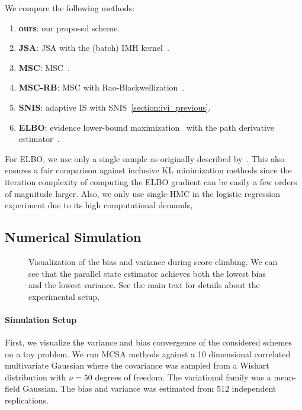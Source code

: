 We compare the following methods:
\begin{enumerate}[noitemsep]
\item[\ding{182}] \textbf{ours}: our proposed scheme.
\item[\ding{183}] \textbf{JSA}: JSA with the (batch) IMH kernel~\citep{pmlr-v124-ou20a}.
\item[\ding{184}] \textbf{MSC}: MSC~\citep{NEURIPS2020_b2070693}.
\item[\ding{185}] \textbf{MSC-RB}: MSC with Rao-Blackwellization~\citep{NEURIPS2020_b2070693}.
\item[\ding{186}] \textbf{SNIS}: adaptive IS with SNIS~\cref{section:ivi_previous}.
\item[\ding{187}] \textbf{ELBO}: evidence lower-bound maximization~\citep{pmlr-v33-ranganath14, JMLR:v18:16-107} with the path derivative estimator~\citep{NIPS2017_e91068ff}.
\end{enumerate}
For ELBO, we use only a single sample as originally described by~\citet{NIPS2017_e91068ff}.
This also ensures a fair comparison against inclusive KL minimization methods since the iteration complexity of computing the ELBO gradient can be easily a few orders of magnitude larger.
Also, we only use single-HMC in the logistic regression experiment due to its high computational demands, 

\subsection{Numerical Simulation}\label{section:simulation}
\begin{figure}
    \vspace{-0.2in}
    \centering
    
    \vspace{-0.2in}
    \caption{Visualization of the bias and variance during score climbing.
      We can see that the parallel state estimator achieves both the lowest bias and the lowest variance.
      See the main text for details about the experimental setup.
    }\label{fig:gaussian}
\end{figure}

\paragraph{Simulation Setup}
First, we visualize the variance and bias convergence of the considered schemes on a toy problem.
We run MCSA methods against a 10 dimensional correlated multivariate Gaussian where the covariance was sampled from a Wishart distribution with \(\nu = 50\) degrees of freedom.
The variational family was a mean-field Gaussian.
The bias and variance was estimated from \(512\) independent replications.

